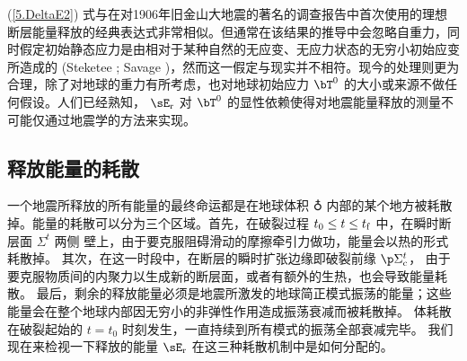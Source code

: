 (\ref{5.DeltaE2}) 式与\textcite{reid10}在对1906年旧金山大地震的著名的调查报告中首次使用的理想断层能量释放的经典表达式非常相似。但通常在该结果的推导中会忽略自重力，同时假定初始静态应力是由相对于某种自然的无应变、无应力状态的无穷小初始应变所造成的 (Steketee \citeyear{steketee58};
Savage \citeyear{savage69})，然而这一假定与现实并不相符。现今的处理则更为合理，除了对地球的重力有所考虑，也对地球初始应力 $\bT^0$ 的大小或来源不做任何假设。人们已经熟知，
$\sE_{\rm r}$ 对 $\bT^0$ 的显性依赖使得对地震能量释放的测量不可能仅通过地震学的方法来实现。
%

\renewcommand{\thesubsection}{$\!\!\!\raise1.3ex\hbox{$\star$}\!\!$
\arabic{chapter}.\arabic{section}.\arabic{subsection}}
\subsection{释放能量的耗散}
\renewcommand{\thesubsection}{\arabic{chapter}.\arabic{section}.\arabic{subsection}}

一个地震所释放的所有能量的最终命运都是在地球体积
$\earth$ 内部的某个地方被耗散掉。能量的耗散可以分为三个区域。首先，在破裂过程 $t_0\leq t\leq t_{\rm f}$ 中，在瞬时断层面 $\Sigma^t$ 两侧 壁上，由于要克服阻碍滑动的摩擦牵引力做功，能量会以热的形式耗散掉。
%
其次，在这一时段中，在断层的瞬时扩张边缘即破裂前缘 $\p\Sigma^t_{\rm c}$， 由于要克服物质间的内聚力以生成新的断层面，或者有额外的生热，也会导致能量耗散。
%
%
最后，剩余的释放能量必须是地震所激发的地球简正模式振荡的能量；这些能量会在整个地球内部因无穷小的非弹性作用造成振荡衰减而被耗散掉。
体耗散在破裂起始的 $t=t_0$ 时刻发生，一直持续到所有模式的振荡全部衰减完毕。
我们现在来检视一下释放的能量 $\sE_{\rm r}$ 在这三种耗散机制中是如何分配的。

